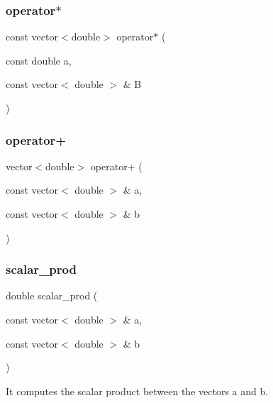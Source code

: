 \subsubsection{\texorpdfstring{operator$\ast$}{operator*}}
{\footnotesize\ttfamily const vector$<$double$>$ operator$\ast$ (\begin{DoxyParamCaption}\item[{const double}]{a,  }\item[{const vector$<$ double $>$ \&}]{B }\end{DoxyParamCaption})\hspace{0.3cm}{\ttfamily [friend]}}

\mbox{\label{class_function_af7fb1be44ca3ade61cec8d396d0a3ca1}} 
\subsubsection{\texorpdfstring{operator+}{operator+}}
{\footnotesize\ttfamily vector$<$double$>$ operator+ (\begin{DoxyParamCaption}\item[{const vector$<$ double $>$ \&}]{a,  }\item[{const vector$<$ double $>$ \&}]{b }\end{DoxyParamCaption})\hspace{0.3cm}{\ttfamily [friend]}}

\mbox{\label{class_function_a5bba89b945d56abb9cf2dd756cf71fb8}} 
\subsubsection{\texorpdfstring{scalar\+\_\+prod}{scalar\_prod}}
{\footnotesize\ttfamily double scalar\+\_\+prod (\begin{DoxyParamCaption}\item[{const vector$<$ double $>$ \&}]{a,  }\item[{const vector$<$ double $>$ \&}]{b }\end{DoxyParamCaption})\hspace{0.3cm}{\ttfamily [friend]}}



It computes the scalar product between the vectors a and b. 



